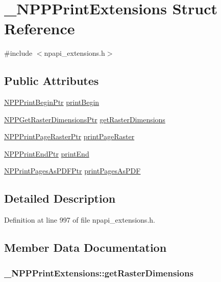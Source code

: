 \hypertarget{struct___n_p_p_print_extensions}{
\section{\_\-NPPPrintExtensions Struct Reference}
\label{struct___n_p_p_print_extensions}
}


{\ttfamily \#include $<$npapi\_\-extensions.h$>$}

\subsection*{Public Attributes}
\begin{DoxyCompactItemize}
\item 
\hyperlink{npapi__extensions_8h_ac4ce3082b0e9d4ba0cd69b296a69a946}{NPPPrintBeginPtr} \hyperlink{struct___n_p_p_print_extensions_adc640a1e956dbf4b1805fc016c232245}{printBegin}
\item 
\hyperlink{npapi__extensions_8h_a73f0f82629c1090966640bc461193624}{NPPGetRasterDimensionsPtr} \hyperlink{struct___n_p_p_print_extensions_af934e8e509cabea2983c09f475061379}{getRasterDimensions}
\item 
\hyperlink{npapi__extensions_8h_a93b16a0532f2d7748c59b5987709a0e5}{NPPPrintPageRasterPtr} \hyperlink{struct___n_p_p_print_extensions_a0ebae32fa147d33669f1454511171122}{printPageRaster}
\item 
\hyperlink{npapi__extensions_8h_afab984aad3dfedabd2b9aae4c8250a8d}{NPPPrintEndPtr} \hyperlink{struct___n_p_p_print_extensions_aa50681f978976055b93ce16a2dfa33be}{printEnd}
\item 
\hyperlink{npapi__extensions_8h_a0aa9a3a1bb215dc36d466efdab898789}{NPPrintPagesAsPDFPtr} \hyperlink{struct___n_p_p_print_extensions_ad4295879540311ab6186f58718dc61df}{printPagesAsPDF}
\end{DoxyCompactItemize}


\subsection{Detailed Description}


Definition at line 997 of file npapi\_\-extensions.h.



\subsection{Member Data Documentation}
\hypertarget{struct___n_p_p_print_extensions_af934e8e509cabea2983c09f475061379}{
\subsubsection[{getRasterDimensions}]{ {\bf \_\-NPPPrintExtensions::getRasterDimensions}}}
\label{struct___n_p_p_print_extensions_af934e8e509cabea2983c09f475061379}


